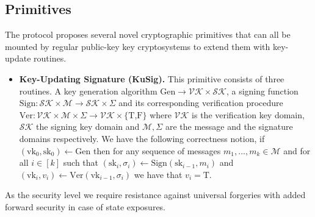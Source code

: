\documentclass[11pt,a4paper,twoside,openright,bibliography=totoc]{scrbook}
\renewcommand{\t}{\text} %
\begin{document}
\subsection{Primitives}
\label{sec:primitives-3}

The protocol proposes several novel cryptographic primitives that can all be
mounted by regular public-key key cryptosystems to extend them
with key-update routines.
\begin{itemize}
\item \textbf{Key-Updating Signature (KuSig).} This primitive consists of
  three routines. A key generation algorithm
  $\t{Gen} \rightarrow \mathcal{VK} \times \mathcal{SK}$, a signing function
  $\t{Sign}: \mathcal{SK} \times \mathcal{M} \rightarrow \mathcal{SK} \times \Sigma$
  and its corresponding verification procedure
  $\t{Ver}: \mathcal{VK} \times \mathcal{M} \times \Sigma
  \rightarrow \mathcal{VK} \times \{\t{T,F}\}$
  where $\mathcal{VK}$ is the verification key domain, $\mathcal{SK}$ the signing
  key domain and $\mathcal{M},\Sigma$ are the message and the signature domains
  respectively. We have the following correctness notion,
  if $(\t{vk}_0,\t{sk}_0) \leftarrow \t{Gen}$ then for any sequence of
  messages $m_1,...,m_k \in \mathcal{M}$ and for all $i \in [k]$
  such that $(\t{sk}_i,\sigma_i) \leftarrow \t{Sign}(\t{sk}_{i-1},m_i)$
  and $(\t{vk}_i,v_i) \leftarrow \t{Ver}(\t{vk}_{i-1},\sigma_i)$ we have
  that $v_i = \t{T}$.
\end{itemize}

As the security level we require resistance against universal forgeries
with added forward security in case of state exposures.
\end{document}
